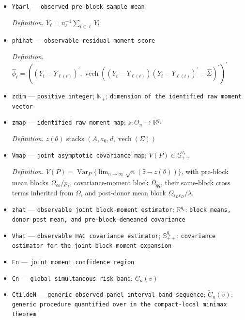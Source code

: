 \documentclass{article}
\begin{document}
\begin{itemize}
  \item \texttt{Ybarl} --- \texttt{observed pre-\allowbreak{}block sample mean}
  \par\smallskip\noindent\emph{Definition.} \(\overline Y_\ell=n_\ell^{-1}\sum_{t\in\ell}Y_t\)
  \item \texttt{phihat} --- \texttt{observable residual moment score}
  \par\smallskip\noindent\emph{Definition.} \(\widehat\phi_t=((Y_t-\overline Y_{\ell(t)})^{\prime},\operatorname{vech}((Y_t-\overline Y_{\ell(t)})(Y_t-\overline Y_{\ell(t)})^{\prime}-\widehat\Sigma)^{\prime})^{\prime}\)
  \item \texttt{zdim} --- \texttt{positive integer}; \(\mathbb N_{+}\); \texttt{dimension of the identified raw moment vector}
  \item \texttt{zmap} --- \texttt{identified raw moment map}; \(z:\Theta_n\to\mathbb R^{q_z}\)
  \par\smallskip\noindent\emph{Definition.} \(z(\theta)\) stacks \((A,a_0,d,\operatorname{vech}(\Sigma))\)
  \item \texttt{Vmap} --- \texttt{joint asymptotic covariance map}; \(V(P)\in\mathbb S_{++}^{q_z}\)
  \par\smallskip\noindent\emph{Definition.} \(V(P)=\operatorname{Var}_P\{\lim_{n\to\infty}\sqrt n(\widehat z-z(\theta))\}\), with pre-block mean blocks \(\Omega_{\varepsilon\varepsilon}/p_\ell\), covariance-moment block \(\Omega_{qq}\), their same-block cross terms inherited from \(\Omega\), and post-donor mean block \(\Omega_{\varepsilon_D\varepsilon_D}/\lambda\).
  \item \texttt{zhat} --- \texttt{observable joint block-\allowbreak{}moment estimator}; \(\mathbb R^{q_z}\); \texttt{block means,\allowbreak{} donor post mean,\allowbreak{} and pre-\allowbreak{}block-\allowbreak{}demeaned covariance}
  \item \texttt{Vhat} --- \texttt{observable HAC covariance estimator}; \(\mathbb S_{++}^{q_z}\); \texttt{covariance estimator for the joint block-\allowbreak{}moment expansion}
  \item \texttt{En} --- \texttt{joint moment confidence region}
  \item \texttt{Cn} --- \texttt{global simultaneous risk band}; \(C_n(v)\)
  \item \texttt{CtildeN} --- \texttt{generic observed-\allowbreak{}panel interval-\allowbreak{}band sequence}; \(\widetilde C_n(v)\); \texttt{generic procedure quantified over in the compact-\allowbreak{}local minimax theorem}

\end{itemize}
\end{document}
